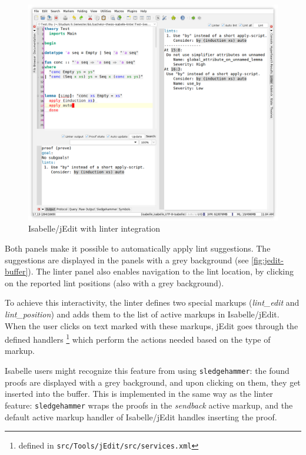 \begin{figure}[htpb]
    \includegraphics[width=\textwidth]{images/jedit-buffer.png}
    \caption{Isabelle/jEdit with linter integration}\label{fig:jedit-buffer}
\end{figure}

Both panels make it possible to automatically apply lint 
suggestions. The suggestions are displayed in the panels with a grey
background (see \autoref{fig:jedit-buffer}). The linter panel also
enables navigation to the lint location, by clicking on the reported lint
positions (also with a grey background).

To achieve this interactivity, the linter defines two special markups
(\textit{lint\_edit} and \textit{lint\_position}) and adds them
to the list of active markups in Isabelle/jEdit. When the user clicks
on text marked with these markups, jEdit goes through the defined handlers 
\footnote{defined in \texttt{src/Tools/jEdit/src/services.xml}} which
perform the actions needed based on the type of markup. 

Isabelle users might recognize this feature from using \texttt{sledgehammer}:
the found proofs are displayed with a grey background, and upon
clicking on them, they get inserted into the buffer. This is implemented
in the same way as the linter feature: \texttt{sledgehammer} wraps
the proofs in the \textit{sendback} active markup, and the default
active markup handler of Isabelle/jEdit handles inserting the proof.


